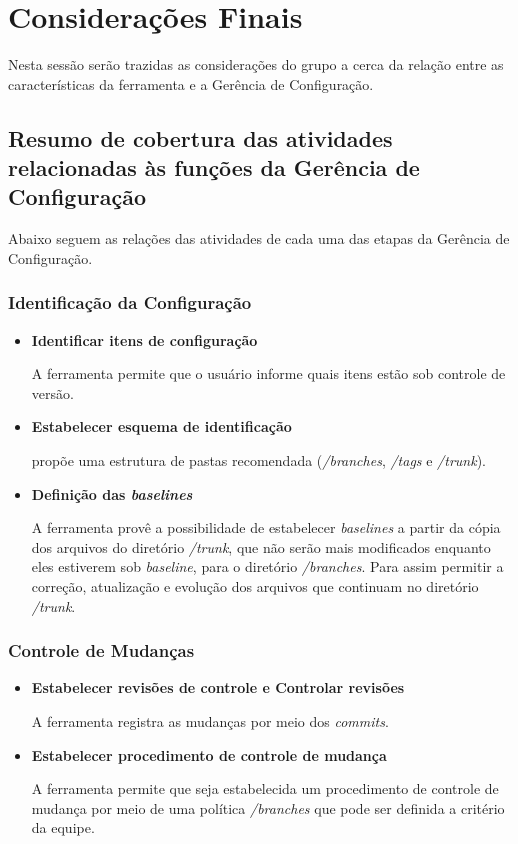 \chapter[Considerações Finais]{Considerações Finais}

Nesta sessão serão trazidas as considerações do grupo a cerca da relação entre as características da ferramenta e a Gerência de Configuração.

\section{Resumo de cobertura das atividades relacionadas às funções da Gerência de Configuração}

Abaixo seguem as relações das atividades de cada uma das etapas da Gerência de Configuração.

 \subsection{Identificação da Configuração}
 \begin{itemize}
  \item \textbf{Identificar itens de configuração}

    A ferramenta permite que o usuário informe quais itens estão sob controle de versão.

  \item \textbf{Estabelecer esquema de identificação}

   propõe uma estrutura de pastas recomendada (\textit{/branches}, \textit{/tags} e \textit{/trunk}).

  \item \textbf{Definição das \textit{baselines}}

  A ferramenta provê a possibilidade de estabelecer \textit{baselines} a partir da cópia dos arquivos do diretório \textit{/trunk},
  que não serão mais modificados enquanto eles estiverem sob \textit{baseline}, para o diretório \textit{/branches}. Para assim permitir a correção, atualização e evolução dos
  arquivos que continuam no diretório \textit{/trunk}.
 \end{itemize}
 \subsection{Controle de Mudanças}
 \begin{itemize}
  \item \textbf{Estabelecer revisões de controle e Controlar revisões}

     A ferramenta registra as mudanças por meio dos \textit{commits}.

  \item \textbf{Estabelecer procedimento de controle de mudança}

  A ferramenta permite que seja estabelecida um procedimento de controle de mudança por meio de uma política \textit{/branches}
  que pode ser definida a critério da equipe.

 \end{itemize}
